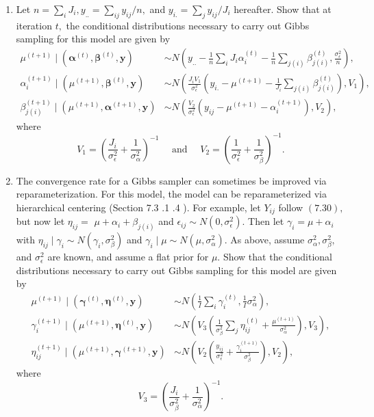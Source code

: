 \documentclass[11pt]{article}
\begin{document}
\begin{enumerate}
    \item Let $n=\sum_{i} J_{i}, y_{. .}=\sum_{i j} y_{i j} / n,$ and $y_{i .}=\sum_{j} y_{i j} / J_{i}$ hereafter. Show that at iteration $t,$ the conditional distributions necessary to carry out Gibbs sampling for this model are given by
    $$
    \begin{aligned}
    \mu^{(t+1)} \mid\left(\boldsymbol{\alpha}^{(t)}, \boldsymbol{\beta}^{(t)}, \mathbf{y}\right) & \sim N\left(y_{..}-\frac{1}{n} \sum_{i} J_{i} \alpha_{i}^{(t)}-\frac{1}{n} \sum_{j(i)} \beta_{j(i)}^{(t)}, \frac{\sigma_{\epsilon}^{2}}{n}\right), \\
    \alpha_{i}^{(t+1)} \mid\left(\mu^{(t+1)}, \boldsymbol{\beta}^{(t)}, \mathbf{y}\right) & \sim N\left(\frac{J_{i} V_{1}}{\sigma_{\epsilon}^{2}}\left(y_{i.}-\mu^{(t+1)}-\frac{1}{J_{i}} \sum_{j(i)} \beta_{j(i)}^{(t)}\right), V_{1}\right), \\
    \beta_{j(i)}^{(t+1)} \mid\left(\mu^{(t+1)}, \boldsymbol{\alpha}^{(t+1)}, \mathbf{y}\right) & \sim N\left(\frac{V_{2}}{\sigma_{\epsilon}^{2}}\left(y_{i j}-\mu^{(t+1)}-\alpha_{i}^{(t+1)}\right), V_{2}\right),
    \end{aligned}
    $$
    where
    $$
    V_{1}=\left(\frac{J_{i}}{\sigma_{\epsilon}^{2}}+\frac{1}{\sigma_{\alpha}^{2}}\right)^{-1} \quad \text { and } \quad V_{2}=\left(\frac{1}{\sigma_{\epsilon}^{2}}+\frac{1}{\sigma_{\beta}^{2}}\right)^{-1}.
    $$
    \item The convergence rate for a Gibbs sampler can sometimes be improved via reparameterization. For this model, the model can be reparameterized via hierarchical centering (Section 7.3 .1 .4 ). For example, let $Y_{i j}$ follow $(7.30),$ but now let $\eta_{i j}=$ $\mu+\alpha_{i}+\beta_{j(i)}$ and $\epsilon_{i j} \sim N\left(0, \sigma_{\epsilon}^{2}\right) .$ Then let $\gamma_{i}=\mu+\alpha_{i}$ with $\eta_{i j} \mid \gamma_{i} \sim N\left(\gamma_{i}, \sigma_{\beta}^{2}\right)$
    and $\gamma_{i} \mid \mu \sim N\left(\mu, \sigma_{\alpha}^{2}\right) .$ As above, assume $\sigma_{\alpha}^{2}, \sigma_{\beta}^{2},$ and $\sigma_{\epsilon}^{2}$ are known, and assume a
    flat prior for $\mu .$ Show that the conditional distributions necessary to carry out Gibbs sampling for this model are given by
    $$
    \begin{aligned}
    \mu^{(t+1)} \mid\left(\boldsymbol{\gamma}^{(t)}, \boldsymbol{\eta}^{(t)}, \mathbf{y}\right) & \sim N\left(\frac{1}{I} \sum_{i} \gamma_{i}^{(t)}, \frac{1}{I} \sigma_{\alpha}^{2}\right) ,\\
    \gamma_{i}^{(t+1)} \mid\left(\mu^{(t+1)}, \boldsymbol{\eta}^{(t)}, \mathbf{y}\right) & \sim N\left(V_{3}\left(\frac{1}{\sigma_{\beta}^{2}} \sum_{j} \eta_{i j}^{(t)}+\frac{\mu^{(t+1)}}{\sigma_{\alpha}^{2}}\right), V_{3}\right), \\
    \eta_{i j}^{(t+1)} \mid\left(\mu^{(t+1)}, \boldsymbol{\gamma}^{(t+1)}, \mathbf{y}\right) & \sim N\left(V_{2}\left(\frac{y_{i j}}{\sigma_{\epsilon}^{2}}+\frac{\gamma_{i}^{(t+1)}}{\sigma_{\beta}^{2}}\right), V_{2}\right),
    \end{aligned}
    $$
    where
    $$
    V_{3}=\left(\frac{J_{i}}{\sigma_{\beta}^{2}}+\frac{1}{\sigma_{\alpha}^{2}}\right)^{-1}.
    $$
\end{enumerate}
\end{document}
